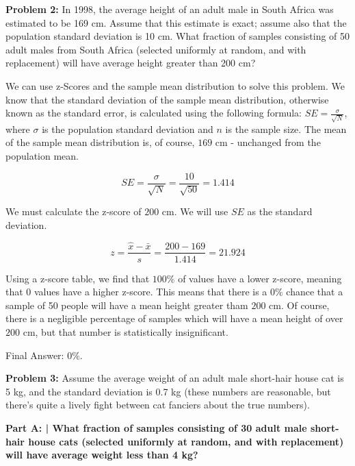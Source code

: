 \documentclass{article}
\begin{document}
 \begin{center}
      \Large\textbf{Problem 2:} In 1998, the average height of an adult male in South Africa was estimated to be 169 cm. Assume that this estimate is exact; assume also that the population standard deviation is 10 cm. What fraction of samples consisting of 50 adult males from South Africa (selected uniformly at random, and with replacement) will have average height greater than 200 cm?\par
 \end{center}
 
 We can use z-Scores and the sample mean distribution to solve this problem. We know that the standard deviation of the sample mean distribution, otherwise known as the standard error, is calculated using the following formula: $SE=\frac{\sigma}{\sqrt{N}}$, where $\sigma$ is the population standard deviation and $n$ is the sample size. The mean of the sample mean distribution is, of course, $169$ cm - unchanged from the population mean. 
 
 \[SE=\frac{\sigma}{\sqrt{N}}=\frac{10}{\sqrt{50}}=1.414\]
 
 We must calculate the z-score of $200$ cm. We will use $SE$ as the standard deviation.
 
 \[z = \frac{\hat{x} - \bar{x}}{s} = \frac{200-169}{1.414} = 21.924\]
 
 Using a z-score table, we find that $100 \%$ of values have a lower z-score, meaning that $0$ values have a higher z-score. This means that there is a $0 \%$ chance that a sample of 50 people will have a mean height greater tham $200$ cm. Of course, there is a negligible percentage of samples which will have a mean height of over $200$ cm, but that number is statistically insignificant.
 
 Final Answer: $0 \%$.\newline
 
 \newpage

 \begin{center}
      \Large\textbf{Problem 3:} Assume the average weight of an adult male short-hair house cat is 5 kg, and the standard deviation is 0.7 kg (these numbers are reasonable, but there’s quite a lively fight between cat fanciers about the true numbers).
      \par
 \end{center}

 \textbf{Part A: | What fraction of samples consisting of 30 adult male short-hair house cats (selected uniformly at random, and with replacement) will have average weight less than 4 kg?}\newline
 
\end{document}
